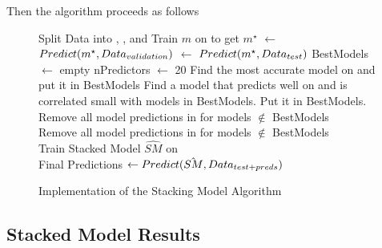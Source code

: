\documentclass[10pt,a4paper, hidelinks]{article} %
\begin{document}
Then the algorithm proceeds as follows
\begin{figure}[H]
	\centering
	\begin{tcolorbox}
		\begin{algorithmic}
			\State Split Data into \dattrain, \datval, and \dattest
			\State Train $m$ on \dattrain to get $m^{\star}$
			\State \datvaltest $\leftarrow$ $Predict(m^{\star},Data_{validation})$
			\State \dattestpreds $\leftarrow$ $Predict(m^{\star},Data_{test})$
			\EndFor
			\State BestModels $\leftarrow $ empty
			\State nPredictors $\leftarrow$ 20
			\State Find the most accurate model on \datval and \State put it in BestModels
			\Else 
				\State Find a model that predicts well  on \datval \State and is correlated small with models in BestModels.  \State Put it in BestModels.
			\EndIf
			\EndFor
			\State Remove all model predictions in \datvaltest for models $\notin$ BestModels\\
			\State Remove all model predictions in \dattestpreds for models $\notin$ BestModels\\
			\State Train Stacked Model $\hat{SM}$ on \datvaltest\\
			\State Final Predictions $\leftarrow Predict(\hat{SM}, Data_{test + preds}) $
		\end{algorithmic}
	\end{tcolorbox}
\caption{Implementation of the Stacking Model Algorithm}
\end{figure}




\subsection{Stacked Model Results}
\end{document}
